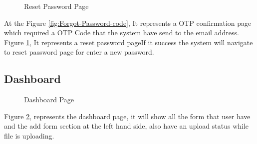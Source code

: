 \documentclass[12pt,oneside,openright,a4paper]{cpe-english-project}
\begin{document}
\begin{figure}[!h]
\centering
{}
\caption{Reset Password Page}\label{fig:Reset Password}
\end{figure}



At the Figure \ref{fig:Forgot-Password-code}, It represents a OTP confirmation page which required a OTP Code that the system have send to the email address. Figure \ref{fig:Reset Password}, It represents a reset password pageIf it success the system will navigate to reset password page for enter a new password.

\newpage
\subsection{Dashboard}

\begin{figure}[!h]
\centering
{}
\caption{Dashboard Page}\label{fig:Dashboard}
\end{figure}

Figure  \ref{fig:Dashboard}, represents the dashboard page, it will show all the form that user have and the add form section at the left hand side, also have an upload status while file is uploading.
\end{document}
